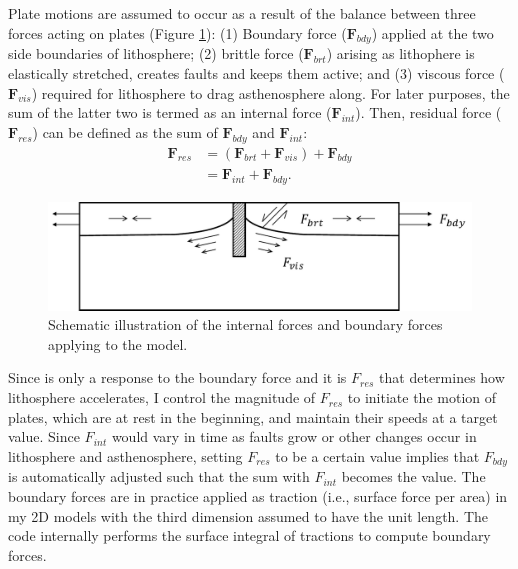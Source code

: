 \documentclass[letterpaper,12pt,notitle]{memphisthesis}                     %
\begin{document}
Plate motions are assumed to occur as a result of the balance between three forces acting on plates (Figure \ref{fig:forcescheme}): (1) Boundary force ($\mathbf{F}_{bdy}$) applied at the two side boundaries of lithosphere; (2) brittle force ($\boldsymbol{F}_{brt}$) arising as lithophere is elastically stretched, creates faults and keeps them active; %
and (3) viscous force ($\boldsymbol{F}_{vis}$) required for lithosphere to drag asthenosphere along. 
For later purposes, the sum of the latter two is termed as an internal force ($\boldsymbol{F}_{int}$). Then, residual force ($\boldsymbol{F}_{res}$) can be defined as the sum of $\boldsymbol{F}_{bdy}$ and $\boldsymbol{F}_{int}$:
%
\begin{align} \label{Fres}
\mathbf{F}_{res} & = (\mathbf{F}_{brt} + \mathbf{F}_{vis}) + \mathbf{F}_{bdy} \\
 & = \mathbf{F}_{int} + \mathbf{F}_{bdy}.
\end{align}
%
\begin{figure}[!htb]
	\centering
	\includegraphics[width=0.7\linewidth]{./figs/force.pdf}
	\caption{Schematic illustration of the internal forces and boundary forces applying to the model.}
	\label{fig:forcescheme}
\end{figure}

Since  is only a response to the boundary force and it is $F_{res}$ that determines how lithosphere accelerates, I control the magnitude of $F_{res}$ to initiate the motion of plates, which are at rest in the beginning, and maintain their speeds at a target value. Since $F_{int}$ would vary in time as faults grow or other changes occur in lithosphere and asthenosphere, setting $F_{res}$ %
to be a certain value implies that $F_{bdy}$ is automatically adjusted such that the sum with $F_{int}$ becomes the value. The boundary forces are in practice applied as traction (i.e., surface force per area) in my 2D models with the third dimension assumed to have the unit length. The code internally performs the surface integral of tractions to compute boundary forces.
\end{document}

